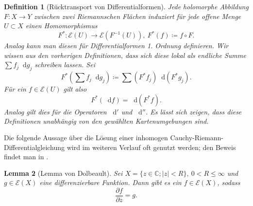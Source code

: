 \documentclass[11pt,a4paper,toc=bibliography]{scrartcl}
\theoremstyle{def}
\newtheorem{defi}{Definition}[section]
\theoremstyle{thm}
\newtheorem{lemma}[defi]{Lemma}
\theoremstyle{remark}
\newcommand*\dif{\mathop{}\!\mathrm{d}}\newcommand{\einschraenkung}{\,\rule[-5pt]{0.4pt}{12pt}\,{}} %
\begin{document}

 \begin{defi}[Rücktransport von Differentialformen]
 	Jede holomorphe Abbildung $F:X\rightarrow Y$ zwischen zwei Riemannschen Flächen induziert für jede offene Menge $U\subset X$ einen Homomorphismus
 	\[
 	F^*:\mathcal{E}(U)\rightarrow \mathcal{E}(F^{-1}(U)),~F^*(f)\coloneqq f\circ F.
 	\]
 	Analog kann man diesen für Differentialformen 1. Ordnung definieren. Wir wissen aus den vorherigen Definitionen, dass sich diese lokal als endliche Summe $\sum f_j\dif g_j$ schreiben lassen. Sei
 	\[
 	F^*(\sum f_j\dif g_j)\coloneqq \sum (F^*f_j)\dif(F^*g_j).
 	\]
 	Für ein $f\in\mathcal{E}(U)$ gilt also
 	\[
 	F^*(\dif f) = \dif (F^*f).
 	\]
 	Analog gilt dies für die Operatoren $\dif'$ und $\dif''$. Es lässt sich zeigen, dass diese Definitionen unabhängig von den gewählten Kartenumgebungen sind. 
 \end{defi}
 Die folgende Aussage über die Lösung einer inhomogen Cauchy-Riemann-Differentialgleichung wird im weiteren Verlauf oft genutzt werden; den Beweis findet man in \cite[~S.97]{forster}.
 \begin{lemma}[Lemma von Dolbeault]
   Sei $X=\{ z\in\mathbb{C}; |z|<R\},~ 0<R\leq\infty$  und  $g\in\mathcal{E}(X)$ eine differenzierbare Funktion. Dann gibt es ein $f\in \mathcal{E}(X)$, sodass
   \[
   \frac{\partial f}{\partial \overline{z}}= g.
   \]
 \end{lemma}
 
 
\end{document}
